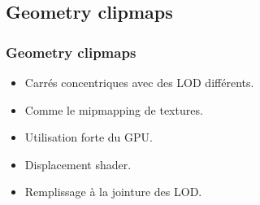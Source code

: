 \documentclass[hyperref={pdfpagelabels=false}]{beamer}
\begin{document}
\subsection{Geometry clipmaps}
\begin{frame}
  \frametitle{Geometry clipmaps}
  \begin{itemize}
  \item Carrés concentriques avec des LOD différents.
  \item Comme le mipmapping de textures.
  \item Utilisation forte du GPU.
  \item Displacement shader.
  \item Remplissage à la jointure des LOD.
  \end{itemize}
\end{frame}
\end{document}
